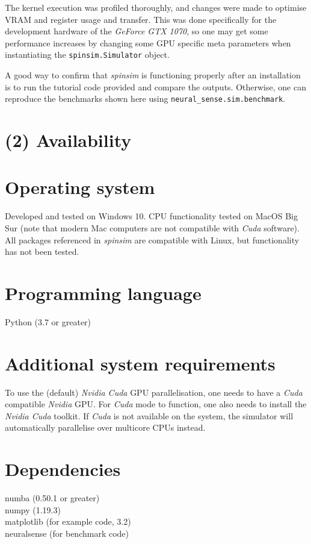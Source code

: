 \documentclass{jors}
\begin{document}
		The kernel execution was profiled thoroughly, and changes were made to optimise VRAM and register usage and transfer.
		This was done specifically for the development hardware of the \emph{GeForce GTX 1070}, so one may get some performance increases by changing some GPU specific meta parameters when instantiating the \texttt{spinsim.Simulator} object.

		A good way to confirm that \emph{spinsim} is functioning properly after an installation is to run the tutorial code provided and compare the outputs.
		Otherwise, one can reproduce the benchmarks shown here using \texttt{neural\_sense.sim.benchmark}.

\section{(2) Availability}
\vspace{0.5cm}
\section{Operating system}
Developed and tested on Windows 10.
CPU functionality tested on MacOS Big Sur (note that modern Mac computers are not compatible with \emph{Cuda} software).
All packages referenced in \emph{spinsim} are compatible with Linux, but functionality has not been tested.

\section{Programming language}
Python (3.7 or greater)

\section{Additional system requirements}
To use the (default) \emph{Nvidia Cuda} GPU parallelisation, one needs to have a \emph{Cuda} compatible \emph{Nvidia} GPU\cite{noauthor_cuda_2012}.
For \emph{Cuda} mode to function, one also needs to install the \emph{Nvidia Cuda} toolkit\cite{noauthor_cuda_2013}.
If \emph{Cuda} is not available on the system, the simulator will automatically parallelise over multicore CPUs instead.

\section{Dependencies}
numba (0.50.1 or greater)\\
numpy (1.19.3)\\
matplotlib (for example code, 3.2)\\
neuralsense (for benchmark code)
\end{document}
